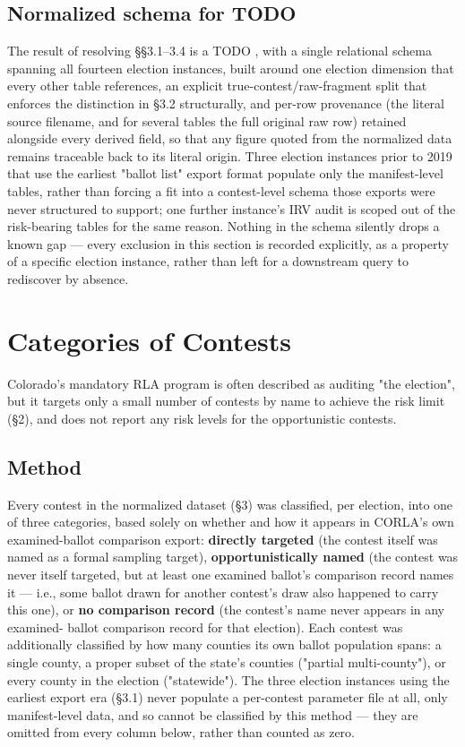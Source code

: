 \subsection{Normalized schema for TODO}

The result of resolving §§3.1–3.4 is a TODO , with a single relational schema spanning
all fourteen election instances, built around one election dimension that
every other table references, an explicit true-contest/raw-fragment split
that enforces the distinction in §3.2 structurally, and per-row provenance
(the literal source filename, and for several tables the full original raw
row) retained alongside every derived field, so that any figure quoted from
the normalized data remains traceable back to its literal origin. Three
election instances prior to 2019 that use the earliest "ballot list" export format
populate only the manifest-level tables, rather than forcing a
fit into a contest-level schema those exports were never structured to
support; one further instance's IRV audit is scoped out of
the risk-bearing tables for the same reason. Nothing in the schema silently
drops a known gap — every exclusion in this section is recorded explicitly,
as a property of a specific election instance, rather than left for a
downstream query to rediscover by absence.

\section{Categories of Contests}

Colorado's mandatory RLA program is often described as
auditing "the election", but it targets only a
small number of contests by name to achieve the risk limit (§2), and does
not report any risk levels for the opportunistic contests.

\subsection{Method}

Every contest in the normalized dataset (§3) was classified, per election,
into one of three categories, based solely on whether and how it
appears in CORLA's own examined-ballot comparison export: \textbf{directly
targeted} (the contest itself was named as a formal sampling target),
\textbf{opportunistically named} (the contest was never itself targeted, but at
least one examined ballot's comparison record names it — i.e., some ballot
drawn for another contest's draw also happened to carry this one), or \textbf{no
comparison record} (the contest's name never appears in any examined-
ballot comparison record for that election). Each contest was additionally
classified by how many counties its own ballot population spans: a single
county, a proper subset of the state's counties ("partial multi-county"),
or every county in the election ("statewide"). The three election
instances using the earliest export era (§3.1) never populate a
per-contest parameter file at all, only manifest-level data, and so
cannot be classified by this method — they are omitted from every column
below, rather than counted as zero.

